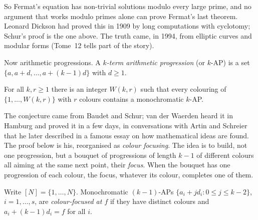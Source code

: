 So Fermat's equation has non-trivial solutions modulo every large prime, and no argument that works modulo primes alone can prove Fermat's last theorem.
Leonard Dickson had proved this in 1909 by long computations with cyclotomy; Schur's proof is the one above. The truth came, in 1994, from elliptic curves and modular forms (Tome~12 tells part of the story).

Now arithmetic progressions. A \emph{$k$-term arithmetic progression} (or $k$-AP) is a set $\{a,a+d,\dots,a+(k-1)d\}$ with $d\ge1$.

\begin{theorem}\label{thm:vdw}
For all $k,r\ge1$ there is an integer $W(k,r)$ such that every colouring of $\{1,\dots,W(k,r)\}$ with $r$ colours contains a monochromatic $k$-AP.
\end{theorem}

The conjecture came from Baudet and Schur; van der Waerden heard it in Hamburg and proved it in a few days, in conversations with Artin and Schreier that
he later described in a famous essay on how mathematical ideas are found. The proof below is his, reorganised as \emph{colour focusing}. The idea is to build,
not one progression, but a bouquet of progressions of length $k-1$ of different colours all aiming at the same next point, their \emph{focus}. When the bouquet has
one progression of each colour, the focus, whatever its colour, completes one of them.

Write $[N]=\{1,\dots,N\}$. Monochromatic $(k-1)$-APs $\{a_i+jd_i:0\le j\le k-2\}$, $i=1,\dots,s$, are \emph{colour-focused at $f$} if they have distinct colours and $a_i+(k-1)d_i=f$
for all $i$.

